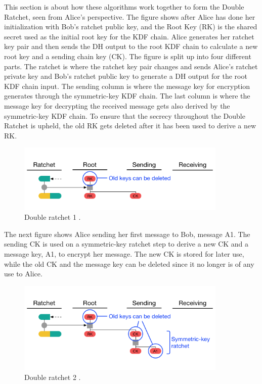This section is about how these algorithms work together to form the
Double Ratchet, seen from Alice’s perspective. The figure shows after Alice
has done her initialization with Bob’s ratchet public key, and the Root Key
(RK) is the shared secret used as the initial root key for the KDF chain.
Alice generates her ratchet key pair and then sends the DH output to
the root KDF chain to calculate a new root key and a sending chain key
(CK). The figure is split up into four different parts. The ratchet is
where the ratchet key pair changes and sends Alice’s ratchet private key
and Bob’s ratchet public key to generate a DH output for the root KDF
chain input. The sending column is where the message key for encryption
generates through the symmetric-key KDF chain. The last column is where
the message key for decrypting the received message gets also derived by
the symmetric-key KDF chain. To ensure that the secrecy throughout the
Double Ratchet is upheld, the old RK gets deleted after it has been used to
derive a new RK.

\begin{figure}[H]
	\centering
	\includegraphics[width=10cm]{figures/doubleratchet1.png}
	\caption{Double ratchet 1 \cite{doubleratchet}.}
	\label{fig:doubleratchet1}
\end{figure}

The next figure shows Alice sending her first message to Bob, message A1.
The sending CK is used on a symmetric-key ratchet step to derive a new
CK and a message key, A1, to encrypt her message. The new CK is stored
for later use, while the old CK and the message key can be deleted since it
no longer is of any use to Alice.

\begin{figure}[H]
	\centering
	\includegraphics[width=10cm]{figures/doubleratchet2.png}
	\caption{Double ratchet 2 \cite{doubleratchet}.}
	\label{fig:doubleratchet2}
\end{figure}

